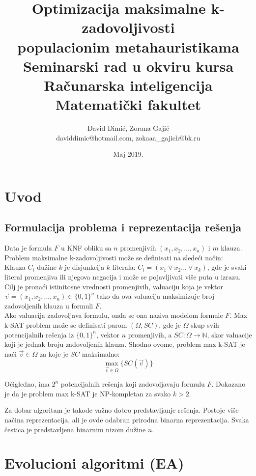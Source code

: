 \documentclass{article}
\title{Optimizacija maksimalne k-zadovoljivosti\\ populacionim metahauristikama\\ \small{Seminarski rad u okviru kursa\\ Računarska inteligencija\\ Matematički fakultet}}
\author{David Dimić, Zorana Gajić \\ daviddimic@hotmail.com, zokaaa\_gajich@bk.ru}
\date{Maj 2019.}
\begin{document}
\maketitle
\tableofcontents
\newpage


\abstract{
}


\section{Uvod}
\label{sec:uvod}


\subsection{Formulacija problema  i reprezentacija rešenja}
\label{subsec:problem_resenje}
Data je formula $F$ u KNF obliku sa $n$ promenjivih $(x_1, x_2, ..., x_n)$ i $m$ klauza. Problem maksimalne k-zadovoljivosti može se definisati na sledeći način:\\ 

Klauza $C_i$ dužine $k$ je disjunkcija $k$ literala: 
$C_i = (x_1  \vee x_2 ... \vee x_k)$, gde je svaki literal promenjiva ili njegova negacija i može se pojavljivati više puta u izrazu.
Cilj je pronaći istinitosne vrednosti promenjivih, valuaciju koja je vektor $\vec{v} = (x_1, x_2, ..., x_n) \in \{ 0,1 \}^n$ tako da ova valuacija maksimizuje broj zadovoljenih klauza u formuli $F$.\\

Ako valuacija zadovoljava formulu, onda se ona naziva modelom formule $F$. Max k-SAT problem može se definisati parom $(\Omega, SC)$, gde je $\Omega$ skup svih potencijalnih rešenja iz $\{0,1\}^n$, vektor $n$ promenjivih, a $SC:\Omega \rightarrow \mathbb{N}$, skor valuacije koji je jednak broju zadovoljenih klauza. Shodno ovome, problem max k-SAT je naći $\vec{v} \in \Omega$ za koje je $SC$ maksimalno:\\
$$\max_{\vec{v} \in \Omega}\{SC(\vec{v})\}$$

Očigledno, ima $2^n$ potencijalnih rešenja koji zadovoljavaju formulu $F$. Dokazano je da je problem max k-SAT je NP-kompletan za svako $k>2$. %

Za dobar algoritam je takođe važno dobro predstavljanje rešenja. Postoje više načina reprezentacija, ali je ovde odabran prirodna binarna reprezentacija. Svaka čestica je predstavljena binarnim nizom dužine $n$.



\section{Evolucioni algoritmi (EA)}
\label{sec:ea}
\end{document}
